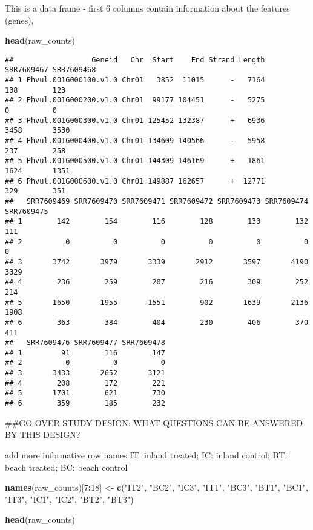 \documentclass[
]{article}
\newenvironment{Shaded}{\begin{snugshade}}{\end{snugshade}}
\newcommand{\DecValTok}[1]{\textcolor[rgb]{0.00,0.00,0.81}{#1}}
\newcommand{\KeywordTok}[1]{\textcolor[rgb]{0.13,0.29,0.53}{\textbf{#1}}}
\newcommand{\NormalTok}[1]{#1}
\newcommand{\OperatorTok}[1]{\textcolor[rgb]{0.81,0.36,0.00}{\textbf{#1}}}
\newcommand{\StringTok}[1]{\textcolor[rgb]{0.31,0.60,0.02}{#1}}
\begin{document}
This is a data frame - first 6 columns contain information about the
features (genes),

\begin{Shaded}
\begin{Highlighting}[]
\KeywordTok{head}\NormalTok{(raw_counts)}
\end{Highlighting}
\end{Shaded}

\begin{verbatim}
##                  Geneid   Chr  Start    End Strand Length SRR7609467 SRR7609468
## 1 Phvul.001G000100.v1.0 Chr01   3852  11015      -   7164        138        123
## 2 Phvul.001G000200.v1.0 Chr01  99177 104451      -   5275          0          0
## 3 Phvul.001G000300.v1.0 Chr01 125452 132387      +   6936       3458       3530
## 4 Phvul.001G000400.v1.0 Chr01 134609 140566      -   5958        237        258
## 5 Phvul.001G000500.v1.0 Chr01 144309 146169      +   1861       1624       1351
## 6 Phvul.001G000600.v1.0 Chr01 149887 162657      +  12771        329        351
##   SRR7609469 SRR7609470 SRR7609471 SRR7609472 SRR7609473 SRR7609474 SRR7609475
## 1        142        154        116        128        133        132        111
## 2          0          0          0          0          0          0          0
## 3       3742       3979       3339       2912       3597       4190       3329
## 4        236        259        207        216        309        252        214
## 5       1650       1955       1551        902       1639       2136       1908
## 6        363        384        404        230        406        370        411
##   SRR7609476 SRR7609477 SRR7609478
## 1         91        116        147
## 2          0          0          0
## 3       3433       2652       3121
## 4        208        172        221
## 5       1701        621        730
## 6        359        185        232
\end{verbatim}

\#\#GO OVER STUDY DESIGN: WHAT QUESTIONS CAN BE ANSWERED BY THIS DESIGN?

add more informative row names IT: inland treated; IC: inland control;
BT: beach treated; BC: beach control

\begin{Shaded}
\begin{Highlighting}[]
\KeywordTok{names}\NormalTok{(raw_counts)[}\DecValTok{7}\OperatorTok{:}\DecValTok{18}\NormalTok{] <-}\StringTok{ }\KeywordTok{c}\NormalTok{(}\StringTok{"IT2"}\NormalTok{, }\StringTok{"BC2"}\NormalTok{, }\StringTok{"IC3"}\NormalTok{, }\StringTok{"IT1"}\NormalTok{, }\StringTok{"BC3"}\NormalTok{, }\StringTok{"BT1"}\NormalTok{, }\StringTok{"BC1"}\NormalTok{, }\StringTok{"IT3"}\NormalTok{, }\StringTok{"IC1"}\NormalTok{, }\StringTok{"IC2"}\NormalTok{, }\StringTok{"BT2"}\NormalTok{, }\StringTok{"BT3"}\NormalTok{)}

\KeywordTok{head}\NormalTok{(raw_counts)}
\end{Highlighting}
\end{Shaded}
\end{document}
